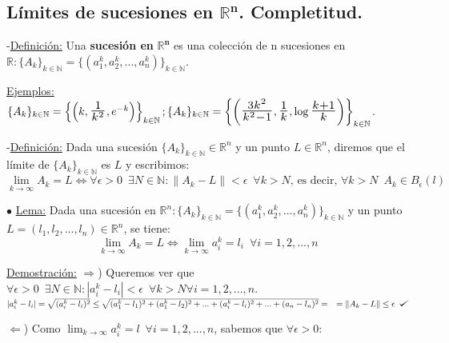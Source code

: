 \documentclass[12pt, titlepage]{article}
\def\checkmark{\tikz\fill[scale=0.4](0,.35) -- (.25,0) -- (1,.7) -- (.25,.15) -- cycle;}
\newcommand{\R}{\mathbb{R}}
\newcommand{\N}{\mathbb{N}}
\newcommand{\bfrac}[2]{\scalebox{1.4}{$\frac{#1}{#2}$}}
\newcommand{\spac}{\, \, \,}
\begin{document}

\subsection{Límites de sucesiones en $\mathbf{\R^n}$. Completitud.}
\vspace{3mm}

-\underline{Definición:} Una \textbf{sucesión en} $\mathbf{\R^n}$ es una colección de n sucesiones en $\R : \{A_k\}_{k \in \N} = \{(a_1^k, a_2^k,..., a_n^k)\}_{k \in \N}$.
\vspace{1mm}

\indent \underline{Ejemplos:} $\{A_k\}_{k \in \N} = \left\{ \left (k, \bfrac{1}{k^2}, e^{-k}\right ) \right \}_{k \in \N}; \{A_k\}_{k \in \N} = \left \{ \left (\bfrac{3k^2}{k^2-1}, \bfrac{1}{k}, \log \bfrac{k+1}{k} \right )\right \}_{k \in \N}$.\vspace{5mm}

\noindent-\underline{Definición:} Dada una sucesión $\{A_k\}_{k \in \N} \in \R^n$ y un punto $L \in \R^n$, diremos que el límite de $\{A_k\}_{k \in \N}$ es $L$ y escribimos: 
\[
\boxed{\displaystyle \lim_{k \to \infty} A_k = L \iff \forall \epsilon > 0 \spac \exists N \in \N : \|A_k - L\| < \epsilon \spac \forall k > N\text{, es decir, } \forall k > N \spac A_k \in B_\epsilon (l)}
\]\vspace{2mm}


\noindent $\bullet$ \underline{Lema:} Dada una sucesión en $\R^n : \{A_k\}_{k \in \N} = \{(a^k_1, a^k_2,..., a^k_n)\}_{k \in \N}$ y un punto $L = (l_1, l_2,..., l_n) \in \R^n$, se tiene:
\[
\boxed{\displaystyle \lim_{k \to \infty} A_k = L \iff \lim_{k \to \infty} a_i^k = l_i \spac \forall i = 1, 2,..., n}
\]

\underline{Demostración:}
$\Rightarrow$) Queremos ver que $\forall \epsilon > 0 \spac \exists N \in \N : |a_i^k - l_i| < \epsilon \spac \forall k > N \forall i = 1, 2,..., n$.\vspace{1mm}\\
$|a_i^k - l_i| =\sqrt{(a_i^k - l_i)^2} \leq \sqrt{(a_1^k - l_1)^2 + (a_1^k - l_2)^2 + ... + (a_i^k - l_i)^2 +... + (a_n - l_n)^2} = \quad = \|A_k - L\| \leq \epsilon \spac \checkmark$\vspace{3mm}

\noindent $\Leftarrow$) Como $\displaystyle \lim_{k \to \infty} a_i^k = l \spac \forall i = 1, 2,..., n$, sabemos que $\forall \epsilon > 0 :$
\end{document}
